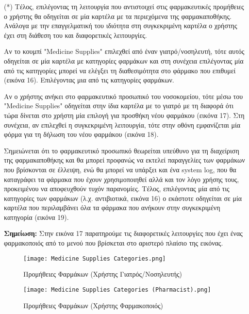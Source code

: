 \documentclass{article}
\begin{document}
(*) Τέλος, επιλέγοντας τη λειτουργία που αντιστοιχεί στις φαρμακευτικές προμήθειες ο χρήστης θα οδηγείται σε μία καρτέλα με τα περιεχόμενα της φαρμακαποθήκης.
Ανάλογα με την επαγγελματική του ιδιότητα στη συγκεκριμένη καρτέλα ο χρήστης έχει στη διάθεση του και διαφορετικές λειτουργίες. \par
Αν το κουμπί "Medicine Supplies" επιλεχθεί από έναν γιατρό/νοσηλευτή, τότε αυτός οδηγείται σε μία καρτέλα με κατηγορίες φαρμάκων και στη συνέχεια επιλέγοντας μία από τις κατηγορίες μπορεί να ελέγξει τη διαθεσιμότητα στο φάρμακο που επιθυμεί (εικόνα 16). Επιλέγοντας μια από τις κατηγορίες φαρμάκων. \par
Αν ο χρήστης ανήκει στο φαρμακευτικό προσωπικό του νοσοκομείου, τότε μέσω του "Medicine Supplies" οδηγείται στην ίδια καρτέλα με το γιατρό με τη διαφορά ότι τώρα δίνεται στο χρήστη μία επιλογή για προσθήκη νέου φαρμάκου (εικόνα 17). Στη συνέχεια, αν επιλεχθεί η συγκεκριμένη λειτουργία, τότε στην οθόνη εμφανίζεται μία φόρμα για τη δήλωση του νέου φαρμάκου (εικόνα 18). \par
Σημειώνεται ότι το φαρμακευτικό προσωπικό θεωρείται υπεύθυνο για τη διαχείριση της φαρμακαποθήκης και θα μπορεί προφανώς να εκτελεί παραγγελίες των φαρμάκων που βρίσκονται σε έλλειψη, ενώ θα μπορεί να υπάρξει και ένα system log, που θα καταγράφει τα φάρμακα που έχουν χρησιμοποιηθεί αλλά και τον λόγο χρήσης τους, προκειμένου να αποφευχθούν τυχόν παρανομίες.
Τέλος, επιλέγοντας μία από τις κατηγορίες των φαρμάκων (λ.χ. αντιβιοτικά, εικόνα 16) ο εκάστοτε οδηγείται σε μία καρτέλα που περιλαμβάνει όλα τα φάρμακα που ανήκουν στην συγκεκριμένη κατηγορία (εικόνα 19). \vspace{0.3cm}

\textbf{Σημείωση:} Στην εικόνα 17 παρατηρούμε τις διαφορετικές λειτουργίες που έχει ένας φαρμακοποιός από το μενού που βρίσκεται στο αριστερό πλαίσιο της εικόνας.

\vspace{0.3cm}

\begin{figure}[!htb]
\centering
\texttt{[image: Medicine Supplies Categories.png]} 
\caption{\label{fig:doctor/nurse} Προμήθειες Φαρμάκων (Χρήστης Γιατρός/Νοσηλευτής)}
\end{figure}

\vspace{0.3cm}

\begin{figure}[!htb]
\centering
\texttt{[image: Medicine Supplies Categories (Pharmacist).png]} 
\caption{\label{fig:Medical Supplies} Προμήθειες Φαρμάκων (Χρήστης Φαρμακοποιός)}
\end{figure}
\end{document}
